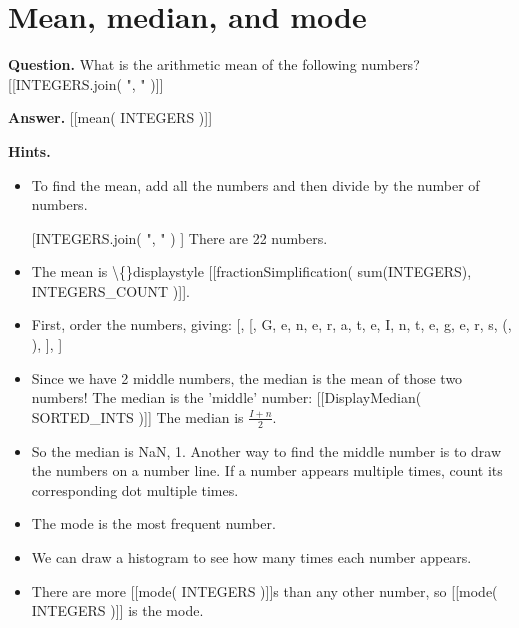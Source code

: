 \documentclass{article}
\begin{document}
\section*{Mean, median, and mode}
\textbf{Question.} What is the arithmetic mean of the following numbers?
                    [[INTEGERS.join( ", " )]]

\textbf{Answer.} [[mean( INTEGERS )]]

\textbf{Hints.}
\begin{itemize}
  \item To find the mean, add all the numbers and then divide by the number of numbers.
  \item [[INTEGERS.join( ", " )]]
                        There are 22 numbers.
  \item The mean is \textbackslash\{\}displaystyle [[fractionSimplification( sum(INTEGERS), INTEGERS\_COUNT )]].
  \item First, order the numbers, giving:
                        [, [, G, e, n, e, r, a, t, e, I, n, t, e, g, e, r, s, (, ), ], ]
  \item Since we have 2 middle numbers, the median is the mean of those two numbers!
                        The median is the 'middle' number:
                        [[DisplayMedian( SORTED\_INTS )]]
                        The median is $\frac{I + n}{2}$.
  \item So the median is NaN, 1.
                        Another way to find the middle number is to draw the numbers on a number line. If a number appears multiple times, count its corresponding dot multiple times.
  \item The mode is the most frequent number.
  \item We can draw a histogram to see how many times each number appears.
  \item There are more [[mode( INTEGERS )]]s than any other number, so [[mode( INTEGERS )]] is the mode.
\end{itemize}
\end{document}
